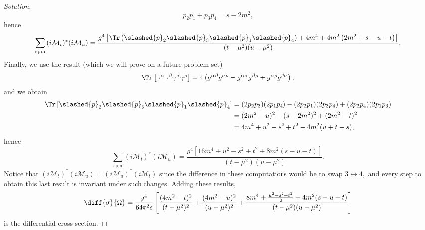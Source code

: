 \begin{proof}[Solution]
\begin{equation*}
       p_2 p_1 + p_3 p_4 = s - 2m^2,
   \end{equation*}
   hence
   \begin{equation*}
       \sum_{\mathrm{spin}}{(i\mathcal{M}_t)^*(i\mathcal{M}_u)} = \frac{g^4\left[\Tr\left(\slashed{p}_2 \slashed{p}_3 \slashed{p}_1 \slashed{p}_4\right) + 4m^4 + 4m^2\left(2m^2 + s - u - t\right)\right]}{(t - \mu^2)(u - \mu^2)}.
   \end{equation*}
   Finally, we use the result (which we will prove on a future problem set)
   \begin{equation*}
       \Tr\left[\gamma^{\alpha} \gamma^\beta \gamma^\sigma \gamma^\rho\right] = 4 \left(g^{\alpha \beta} g^{\sigma \rho} - g^{\alpha \sigma} g^{\beta \rho} + g^{\alpha \rho}g^{\beta \sigma}\right),
   \end{equation*}
   and we obtain
   \begin{align*}
       \Tr\left[\slashed{p}_2 \slashed{p}_3 \slashed{p}_1 \slashed{p}_4\right] 
       &= (2p_2 p_3) (2p_1 p_4) - (2p_2 p_1) (2p_3 p_4) + (2p_2 p_4)(2p_1 p_3)\\
       &= (2m^2 - u)^2 - (s - 2m^2)^2 + (2m^2 - t)^2\\
       &= 4m^4 + u^2 - s^2 + t^2 - 4m^2(u + t - s),
   \end{align*}
   hence
   \begin{equation*}
       \sum_{\mathrm{spin}}{(i\mathcal{M}_t)^*(i\mathcal{M}_u)} = \frac{g^4\left[16m^4 + u^2 - s^2 + t^2 + 8m^2\left(s - u - t\right)\right]}{(t - \mu^2)(u - \mu^2)}.
   \end{equation*}
   Notice that \((i\mathcal{M}_t)^* (i \mathcal{M}_u) = (i\mathcal{M}_u)^* (i \mathcal{M}_t)\) since the difference in these computations would be to swap \(3 \leftrightarrow 4,\) and every step to obtain this last result is invariant under such changes. Adding these results, 
   \begin{equation*}
       \diff{\sigma}{\Omega} = \frac{g^4}{64 \pi^2 s}\left[\frac{(4m^2 - t)^2}{(t - \mu^2)^2} + \frac{(4m^2 - u)^2}{(u - \mu^2)^2} + \frac{8m^4 + \frac{u^2 - s^2 + t^2}{2} + 4m^2(s - u - t)}{(t - \mu^2)(u - \mu^2)}\right]
   \end{equation*}
   is the differential cross section.
\end{proof}
